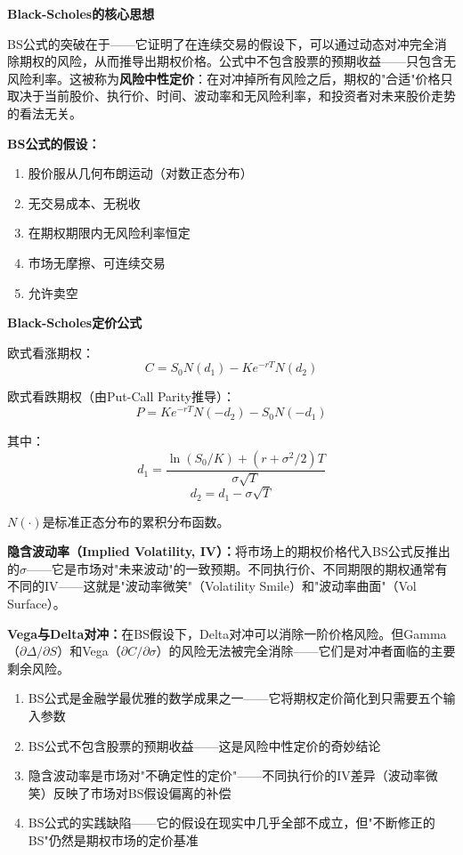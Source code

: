 \documentclass[a4paper,11pt]{ctexbook}
\begin{document}
\begin{qualitative}
\textbf{Black-Scholes的核心思想}

BS公式的突破在于——它证明了在连续交易的假设下，可以通过动态对冲完全消除期权的风险，从而推导出期权价格。公式中不包含股票的预期收益——只包含无风险利率。这被称为\textbf{风险中性定价}：在对冲掉所有风险之后，期权的"合适"价格只取决于当前股价、执行价、时间、波动率和无风险利率，和投资者对未来股价走势的看法无关。

\textbf{BS公式的假设：}
\begin{enumerate}
  \item 股价服从几何布朗运动（对数正态分布）
  \item 无交易成本、无税收
  \item 在期权期限内无风险利率恒定
  \item 市场无摩擦、可连续交易
  \item 允许卖空
\end{enumerate}
\end{qualitative}

\begin{quantitative}
\textbf{Black-Scholes定价公式}

欧式看涨期权：
\[
C = S_0 N(d_1) - K e^{-rT} N(d_2)
\]

欧式看跌期权（由Put-Call Parity推导）：
\[
P = K e^{-rT} N(-d_2) - S_0 N(-d_1)
\]

其中：
\[
d_1 = \frac{\ln(S_0/K) + (r + \sigma^2/2)T}{\sigma\sqrt{T}}
\]
\[
d_2 = d_1 - \sigma\sqrt{T}
\]

$N(\cdot)$是标准正态分布的累积分布函数。

\textbf{隐含波动率（Implied Volatility, IV）：}将市场上的期权价格代入BS公式反推出的$\sigma$——它是市场对"未来波动"的一致预期。不同执行价、不同期限的期权通常有不同的IV——这就是"波动率微笑"（Volatility Smile）和"波动率曲面"（Vol Surface）。

\textbf{Vega与Delta对冲：}在BS假设下，Delta对冲可以消除一阶价格风险。但Gamma（$\partial \Delta / \partial S$）和Vega（$\partial C / \partial \sigma$）的风险无法被完全消除——它们是对冲者面临的主要剩余风险。
\end{quantitative}

\begin{lessonsummary}
\begin{enumerate}
  \item BS公式是金融学最优雅的数学成果之一——它将期权定价简化到只需要五个输入参数
  \item BS公式不包含股票的预期收益——这是风险中性定价的奇妙结论
  \item 隐含波动率是市场对"不确定性的定价"——不同执行价的IV差异（波动率微笑）反映了市场对BS假设偏离的补偿
  \item BS公式的实践缺陷——它的假设在现实中几乎全部不成立，但"不断修正的BS"仍然是期权市场的定价基准
\end{enumerate}
\end{lessonsummary}
\end{document}

